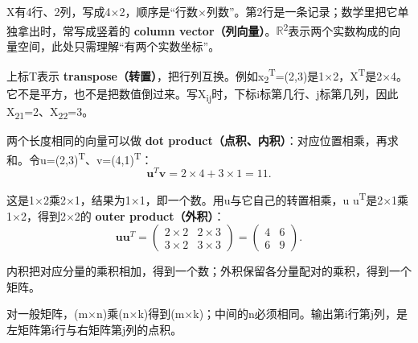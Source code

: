X有4行、2列，写成4\ensuremath{\times}2，顺序是“行数\ensuremath{\times}列数”。第2行是一条记录；数学里把它单独拿出时，常写成竖着的 \textbf{column vector（列向量）}。\ensuremath{\mathbb{R}}\textsuperscript{2}表示两个实数构成的向量空间，此处只需理解“有两个实数坐标”。






上标T表示 \textbf{transpose（转置）}，把行列互换。例如x\textsubscript{2}\textsuperscript{T}=(2,3)是1\ensuremath{\times}2，X\textsuperscript{T}是2\ensuremath{\times}4。它不是平方，也不是把数值倒过来。写X\textsubscript{i}\textsubscript{j}时，下标i标第几行、j标第几列，因此X\textsubscript{2}\textsubscript{1}=2、X\textsubscript{2}\textsubscript{2}=3。








两个长度相同的向量可以做 \textbf{dot product（点积、内积）}：对应位置相乘，再求和。令u=(2,3)\textsuperscript{T}、v=(4,1)\textsuperscript{T}：
\[
\mathbf{u}^T\mathbf{v}=2\times4+3\times1=11.\tag{M.24}
\]


这是1\ensuremath{\times}2乘2\ensuremath{\times}1，结果为1\ensuremath{\times}1，即一个数。用u与它自己的转置相乘，u u\textsuperscript{T}是2\ensuremath{\times}1乘1\ensuremath{\times}2，得到2\ensuremath{\times}2的 \textbf{outer product（外积）}：
\[
\mathbf{u}\mathbf{u}^T=
\begin{pmatrix}2\times2&2\times3\\3\times2&3\times3\end{pmatrix}
=\begin{pmatrix}4&6\\6&9\end{pmatrix}.\tag{M.25}
\]


内积把对应分量的乘积相加，得到一个数；外积保留各分量配对的乘积，得到一个矩阵。


对一般矩阵，(m\ensuremath{\times}n)乘(n\ensuremath{\times}k)得到(m\ensuremath{\times}k)；中间的n必须相同。输出第i行第j列，是左矩阵第i行与右矩阵第j列的点积。


